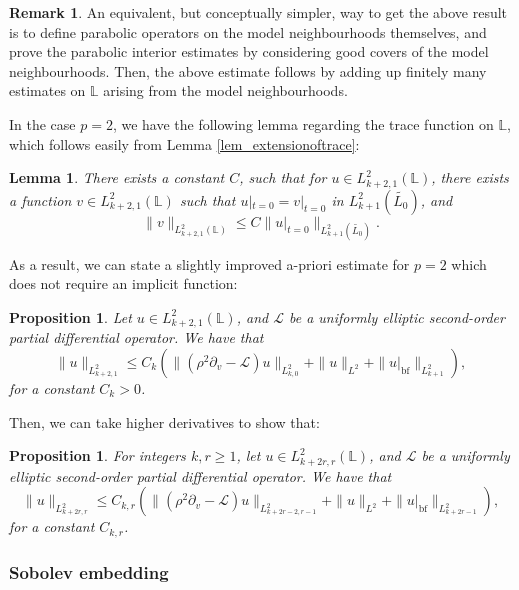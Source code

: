 \documentclass[10pt, a4paper]{article}
\theoremstyle{plain}%
\newtheorem{lem}[theorem]{Lemma}
\newtheorem{prop}[theorem]{Proposition}
\theoremstyle{definition}
\newtheorem{rem}[theorem]{Remark}
\numberwithin{figure}{section}
\numberwithin{equation}{section}
\newcommand{\bL}{\mathbb{L}}
\newcommand{\pa}{\partial}
\newcommand{\cL}{\mathcal{L}}
\begin{document}
\begin{rem}\label{rem_modelvsgood}
	An equivalent, but conceptually simpler, way to get the above result is to define parabolic operators on the model neighbourhoods themselves, and prove the parabolic interior estimates by considering good covers of the model neighbourhoods. Then, the above estimate follows by adding up finitely many estimates on $\bL$ arising from the model neighbourhoods.
\end{rem}

In the case $p=2$, we have the following lemma regarding the trace function on $\bL$, which follows easily from Lemma \ref{lem_extensionoftrace}:
\begin{lem}
	There exists a constant $C$, such that for $u\in L^2_{k+2,1}(\bL)$, there exists a function $v\in L^2_{k+2,1}(\bL)$ such that  $u|_{t=0}=v|_{t=0}$ in $L^2_{k+1}(\widetilde{L_0})$, and \[
	\|v\|_{L^2_{k+2,1}(\bL)} \leq C\|u|_{t=0}\|_{L^2_{k+1}(\widetilde{L_0})}.
	\]
\end{lem}
As a result, we can state a slightly improved a-priori estimate for $p=2$ which does not require an implicit function:
\begin{prop}
	Let $u\in L^2_{k+2,1}(\bL)$, and $\cL$ be a uniformly elliptic second-order partial differential operator. We have that \begin{equation}\label{eq_basicestimate3}
		\|u\|_{L^2_{k+2,1}}
		\leq C_{k}\left(\|(\rho^2\pa_v-\cL)u\|_{L^2_{k,0}}+\|u\|_{L^2}+\|u|_{\mathrm{bf}}\|_{L^2_{k+1}}\right),
	\end{equation}
	for a constant $C_{k}>0$.
\end{prop}

Then, we can take higher derivatives to show that:
\begin{prop}
	For integers $k,r\geq1$, let $u\in L^2_{k+2r,r}(\bL)$, and $\cL$ be a uniformly elliptic second-order partial differential operator. We have that \begin{equation}\label{eq_basicestimate4}
		\|u\|_{L^2_{k+2r,r}}
		\leq C_{k,r}\left(\|(\rho^2\pa_v-\cL)u\|_{L^2_{k+2r-2,r-1}}+\|u\|_{L^2}+\|u|_{\mathrm{bf}}\|_{L^2_{k+2r-1}}\right),
	\end{equation}
	for a constant $C_{k,r}$.
\end{prop}





\subsubsection{Sobolev embedding}\label{subsubsec_Sobolevembedding}
\end{document}
